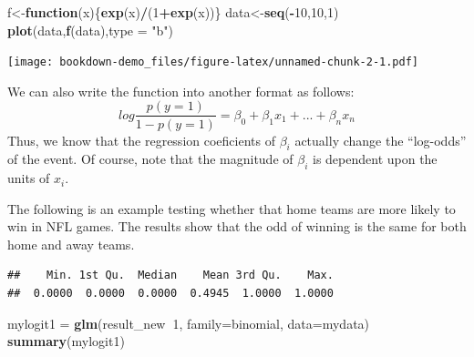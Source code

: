 \documentclass[]{book}
\newenvironment{Shaded}{\begin{snugshade}}{\end{snugshade}}
\newcommand{\ControlFlowTok}[1]{\textcolor[rgb]{0.13,0.29,0.53}{\textbf{#1}}}
\newcommand{\DataTypeTok}[1]{\textcolor[rgb]{0.13,0.29,0.53}{#1}}
\newcommand{\DecValTok}[1]{\textcolor[rgb]{0.00,0.00,0.81}{#1}}
\newcommand{\KeywordTok}[1]{\textcolor[rgb]{0.13,0.29,0.53}{\textbf{#1}}}
\newcommand{\NormalTok}[1]{#1}
\newcommand{\OperatorTok}[1]{\textcolor[rgb]{0.81,0.36,0.00}{\textbf{#1}}}
\newcommand{\StringTok}[1]{\textcolor[rgb]{0.31,0.60,0.02}{#1}}
\begin{document}
\begin{Shaded}
\begin{Highlighting}[]
\NormalTok{f<-}\ControlFlowTok{function}\NormalTok{(x)\{}\KeywordTok{exp}\NormalTok{(x)}\OperatorTok{/}\NormalTok{(}\DecValTok{1}\OperatorTok{+}\KeywordTok{exp}\NormalTok{(x))\}}
\NormalTok{data<-}\KeywordTok{seq}\NormalTok{(}\OperatorTok{-}\DecValTok{10}\NormalTok{,}\DecValTok{10}\NormalTok{,}\DecValTok{1}\NormalTok{)}
\KeywordTok{plot}\NormalTok{(data,}\KeywordTok{f}\NormalTok{(data),}\DataTypeTok{type =} \StringTok{"b"}\NormalTok{)}
\end{Highlighting}
\end{Shaded}

\texttt{[image: bookdown-demo\_files/figure-latex/unnamed-chunk-2-1.pdf]}

We can also write the function into another format as follows:
\[log \frac{p(y=1)}{1-p(y=1)}= \beta_0+\beta_1x_1+...+\beta_nx_n\]
Thus, we know that the regression coeficients of \(\beta_i\) actually change the ``log-odds'' of the event. Of course, note that the magnitude of \(\beta_i\) is dependent upon the units of \(x_i\).

The following is an example testing whether that home teams are more likely to win in NFL games. The results show that the odd of winning is the same for both home and away teams.

\begin{Shaded}
\end{Shaded}

\begin{verbatim}
##    Min. 1st Qu.  Median    Mean 3rd Qu.    Max. 
##  0.0000  0.0000  0.0000  0.4945  1.0000  1.0000
\end{verbatim}

\begin{Shaded}
\begin{Highlighting}[]
\NormalTok{mylogit1 =}\StringTok{ }\KeywordTok{glm}\NormalTok{(result_new}\OperatorTok{~}\DecValTok{1}\NormalTok{, }\DataTypeTok{family=}\NormalTok{binomial, }\DataTypeTok{data=}\NormalTok{mydata)}
\KeywordTok{summary}\NormalTok{(mylogit1)}
\end{Highlighting}
\end{Shaded}
\end{document}
